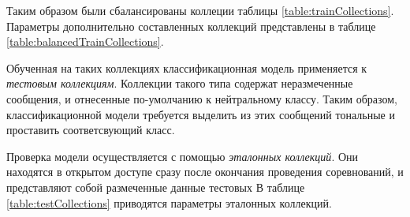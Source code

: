     Таким образом были сбалансированы коллеции таблицы \ref{table:trainCollections}.
    Параметры дополнительно составленных коллекций представлены
    в таблице \ref{table:balancedTrainCollections}.

    

    Обученная на таких коллекциях классификационная модель применяется к
    {\it тестовым коллекциям}.
    Коллекции такого типа содержат неразмеченные сообщения, и отнесенные по-умолчанию
    к нейтральному классу.
    Таким образом, классификационной модели требуется выделить из этих сообщений
    тональные и проставить соответсвующий класс.

    Проверка модели осуществляется с помощью {\it эталонных коллекций}.
    Они находятся в открытом доступе сразу после окончания проведения соревнований,
    и представляют собой размеченные данные тестовых
    В таблице \ref{table:testCollections} приводятся параметры эталонных коллекций.

    

